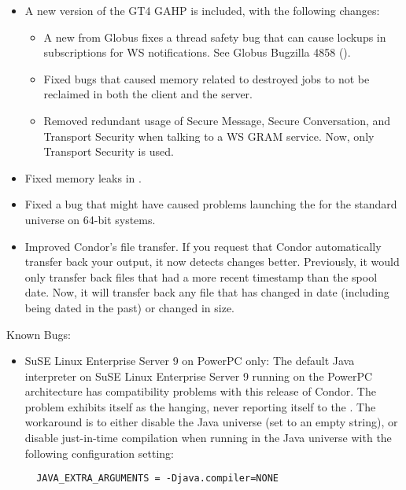 \begin{itemize}
\item A new version of the GT4 GAHP is included, with the following changes:

  \begin{itemize}

  \item A new  from Globus fixes a thread safety bug that
  can cause lockups in subscriptions for WS notifications. See Globus
  Bugzilla 4858
  ().

  \item Fixed bugs that caused memory related to destroyed jobs to not
  be reclaimed in both the client and the server.

  \item Removed redundant usage of Secure Message, Secure Conversation,
  and Transport Security when talking to a WS GRAM service. Now, only
  Transport Security is used.

  \end{itemize}

\item Fixed memory leaks in .

\item Fixed a bug that might have caused  problems
launching the  for the standard universe on 64-bit systems.

\item Improved Condor's file transfer.  If you request that Condor
automatically transfer back your output, it now detects changes better.
Previously, it would only transfer back files that had a more recent timestamp 
than the spool date.  Now, it will transfer back any file that has changed
in date (including being dated in the past) or changed in size.

\end{itemize}

\noindent Known Bugs:

\begin{itemize}

\item SuSE Linux Enterprise Server 9 on PowerPC only: The default Java
interpreter on SuSE Linux Enterprise Server 9 running on the PowerPC
architecture has compatibility problems with this release of Condor.  The
problem exhibits itself as the  hanging, never reporting itself
to the .  The workaround is to either disable the Java
universe (set  to an empty string), or disable just-in-time
compilation when running in the Java universe with the following configuration
setting:
\begin{verbatim}
  JAVA_EXTRA_ARGUMENTS = -Djava.compiler=NONE
\end{verbatim}

\end{itemize}




